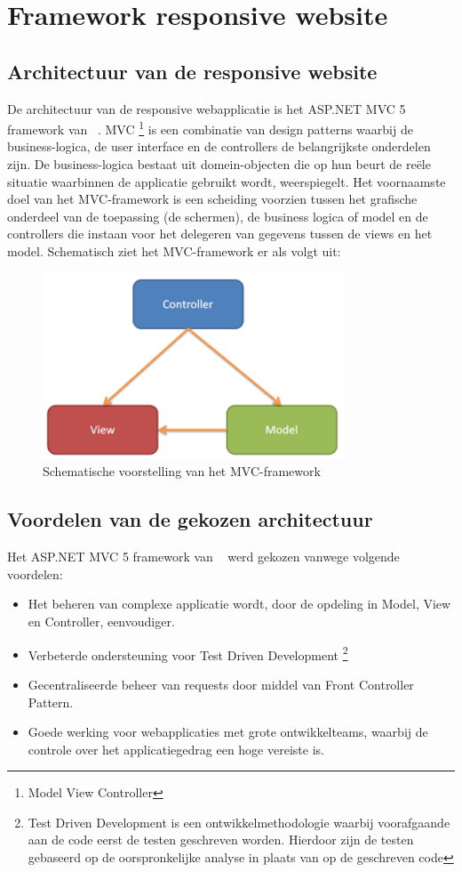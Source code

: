 \chapter{Framework responsive website}
\label{ch:frameworkresponsivewebsite}
\section{Architectuur van de responsive website}
De architectuur van de responsive webapplicatie is het ASP.NET MVC 5 framework van ~\cite{aspnetmvcoverview}.
MVC \footnote{Model View Controller} is een combinatie van design patterns waarbij de business-logica, de user interface en de controllers de belangrijkste
onderdelen zijn. De business-logica bestaat uit domein-objecten die op hun beurt de reële situatie waarbinnen de applicatie
gebruikt wordt, weerspiegelt. Het voornaamste doel van het MVC-framework is een scheiding voorzien tussen het grafische
onderdeel van de toepassing (de schermen), de business logica of model en de controllers die instaan voor het delegeren van gegevens
tussen de views en het model. Schematisch ziet het MVC-framework er als volgt uit:
\begin{figure}[ht!]
\centering
\caption{Schematische voorstelling van het MVC-framework \cite{crossplatformmobiledevelopmentinvisualstudio}}
\includegraphics[width=90mm]{./img/mvc.png}
\end{figure}
\section{Voordelen van de gekozen architectuur}
Het ASP.NET MVC 5 framework van ~\cite{aspnetmvcoverview} werd gekozen vanwege volgende voordelen:
\begin{itemize}
  \item Het beheren van complexe applicatie wordt, door de opdeling in Model, View en Controller, eenvoudiger.
  \item Verbeterde ondersteuning voor Test Driven Development \footnote{Test Driven Development is een ontwikkelmethodologie waarbij voorafgaande aan de code eerst de testen geschreven worden. Hierdoor zijn de testen gebaseerd op de oorspronkelijke analyse in plaats van op de geschreven code}
  \item Gecentraliseerde beheer van requests door middel van Front Controller Pattern.
  \item Goede werking voor webapplicaties met grote ontwikkelteams, waarbij de controle over het applicatiegedrag een hoge vereiste is.
\end{itemize}

